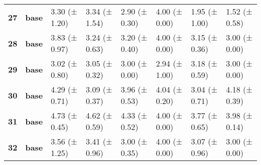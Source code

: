 \begin{longtable}{llllllll}
\cline{1-8}
\textbf{27} & \textbf{base} & 3.30 (± 1.20) & 3.34 (± 1.54) & 2.90 (± 0.30) & 4.00 (± 0.00) & 1.95 (± 1.00) & 1.52 (± 0.58) \\
\cline{1-8}
\textbf{28} & \textbf{base} & 3.83 (± 0.97) & 3.24 (± 0.63) & 3.20 (± 0.40) & 4.00 (± 0.00) & 3.15 (± 0.36) & 3.00 (± 0.00) \\
\cline{1-8}
\textbf{29} & \textbf{base} & 3.02 (± 0.80) & 3.05 (± 0.32) & 3.00 (± 0.00) & 2.94 (± 1.00) & 3.18 (± 0.59) & 3.00 (± 0.00) \\
\cline{1-8}
\textbf{30} & \textbf{base} & 4.29 (± 0.71) & 3.09 (± 0.37) & 3.96 (± 0.53) & 4.04 (± 0.20) & 3.04 (± 0.71) & 4.18 (± 0.39) \\
\cline{1-8}
\textbf{31} & \textbf{base} & 4.73 (± 0.45) & 4.62 (± 0.59) & 4.33 (± 0.52) & 4.00 (± 0.00) & 3.77 (± 0.65) & 3.98 (± 0.14) \\
\cline{1-8}
\textbf{32} & \textbf{base} & 3.56 (± 1.25) & 3.41 (± 0.96) & 3.00 (± 0.35) & 4.00 (± 0.00) & 3.07 (± 0.96) & 3.00 (± 0.00) \\
\cline{1-8}
\end{longtable}
